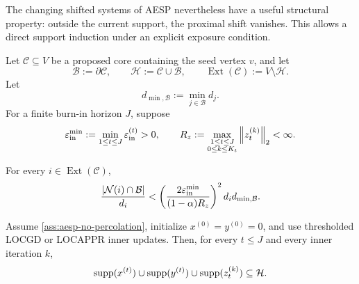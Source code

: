 The changing shifted systems of AESP nevertheless have a useful structural
property: outside the current support, the proximal shift vanishes.  This
allows a direct support induction under an explicit exposure condition.

Let \(\mathcal C\subseteq V\) be a proposed core containing the seed vertex
\(v\), and let
\begin{equation}
    \mathcal B:=\partial\mathcal C,
    \qquad
    \mathcal H:=\mathcal C\cup\mathcal B,
    \qquad
    \operatorname{Ext}(\mathcal C):=V\setminus\mathcal H.
    \label{eq:core-boundary}
\end{equation}
Let
\begin{equation}
    d_{\min,\mathcal B}
    :=\min_{j\in\mathcal B}d_j.
    \label{eq:min-boundary-degree}
\end{equation}
For a finite burn-in horizon \(J\), suppose
\begin{equation}
    \varepsilon_{\mathrm{in}}^{\min}
    :=\min_{1\leq t\leq J}\varepsilon_{\mathrm{in}}^{(t)}>0,
    \qquad
    R_z
    :=\max_{\substack{1\leq t\leq J\\0\leq k\leq K_t}}
       \left\lVert z_t^{(k)}\right\rVert_2<\infty.
    \label{eq:threshold-and-radius}
\end{equation}

\begin{assumption}
\label{ass:aesp-no-percolation}
For every \(i\in\operatorname{Ext}(\mathcal C)\),
\begin{equation}
    \frac{\left\lvert \mathcal N(i)\cap\mathcal B\right\rvert}{d_i}
    <
    \left(
      \frac{2\varepsilon_{\mathrm{in}}^{\min}}{(1-\alpha)R_z}
    \right)^2
    d_i d_{\min,\mathcal B}.
    \label{eq:aesp-no-percolation}
\end{equation}
\end{assumption}

\begin{proposition}
\label{prop:aesp-confinement}
Assume \cref{ass:aesp-no-percolation}, initialize
\(x^{(0)}=y^{(0)}=0\), and use thresholded LOCGD or LOCAPPR inner updates.
Then, for every \(t\leq J\) and every inner iteration \(k\),
\begin{equation}
    \operatorname{supp}(x^{(t)})\cup\operatorname{supp}(y^{(t)})
    \cup\operatorname{supp}(z_t^{(k)})
    \subseteq\mathcal H.
    \label{eq:aesp-support-confinement}
\end{equation}
\end{proposition}

